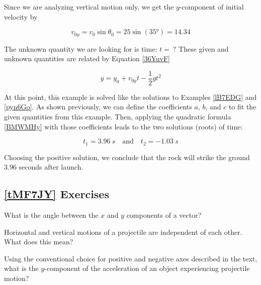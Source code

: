 \documentclass[main.tex]{subfiles}
\begin{document}
\vspace{1em}

Since we are analyzing vertical motion only, we get the $y$-component of initial velocity by

\begin{equation*}
    v_{0y} = v_0 \sin{\theta_0} = 25 \sin{(\ang{35})} = 14.34
\end{equation*}

 The unknown quantity we are looking for is time: $t =\ ?$ These given and unknown quantities are related by Equation \eqref{36YuvF}

\begin{equation*}
    y = y_0 + v_{0y}t - \frac{1}{2} g t^2
\end{equation*}

At this point, this example is solved like the solutions to Examples \ref{lB7EDG} and \ref{pyn6Go}. As shown previously, we can define the coefficients $a$, $b$, and $c$ to fit the given quantities from this example. Then, applying the quadratic formula \eqref{BMWMHy} with those coefficients leads to the two solutions (roots) of time:

\begin{equation*}
    t_1 = \SI{3.96}{s} \quad \text{and} \quad t_2 = \SI{-1.03}{s}
\end{equation*}

Choosing the positive solution, we conclude that the rock will strike the ground 3.96 seconds after launch.

\subsection*{\ref{tMF7JY} Exercises}

\begin{exercise} \label{90PABl}
    What is the angle between the $x$ and $y$ components of a vector?
\end{exercise}

\begin{exercise}
    Horizontal and vertical motions of a projectile are independent of each other. What does this mean?
\end{exercise}

\begin{exercise} \label{YYBBp5}
    Using the conventional choice for positive and negative axes described in the text, what is the $y$-component of the acceleration of an object experiencing projectile motion?
\end{exercise}
\end{document}
